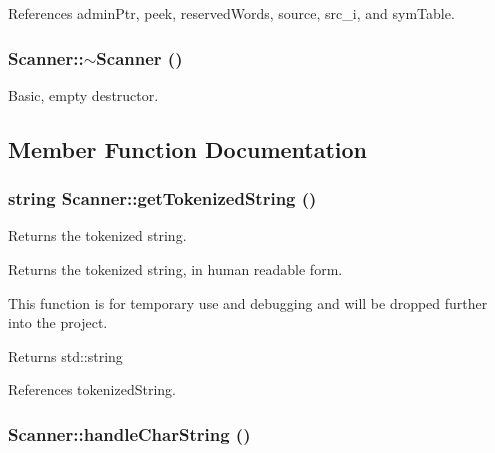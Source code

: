 References adminPtr, peek, reservedWords, source, src\_\-i, and symTable.

\hypertarget{classScanner_a39f85e20f3ca942fd0a8e4bce88c27c7}{
\subsubsection[{$\sim$Scanner}]{\setlength{\rightskip}{0pt plus 5cm}Scanner::$\sim$Scanner ()}}
\label{classScanner_a39f85e20f3ca942fd0a8e4bce88c27c7}


Basic, empty destructor. 



\subsection{Member Function Documentation}
\hypertarget{classScanner_ad538231c15e7577c026a10be9b17f373}{
\subsubsection[{getTokenizedString}]{\setlength{\rightskip}{0pt plus 5cm}string Scanner::getTokenizedString ()}}
\label{classScanner_ad538231c15e7577c026a10be9b17f373}


Returns the tokenized string. 

Returns the tokenized string, in human readable form.

This function is for temporary use and debugging and will be dropped further into the project. \begin{DoxyReturn}{Returns}
std::string 
\end{DoxyReturn}


References tokenizedString.

\hypertarget{classScanner_a5c9ba68f3ad81f1c95d42e0edcada347}{
\subsubsection[{handleCharString}]{ Scanner::handleCharString ()}}
\label{classScanner_a5c9ba68f3ad81f1c95d42e0edcada347}


